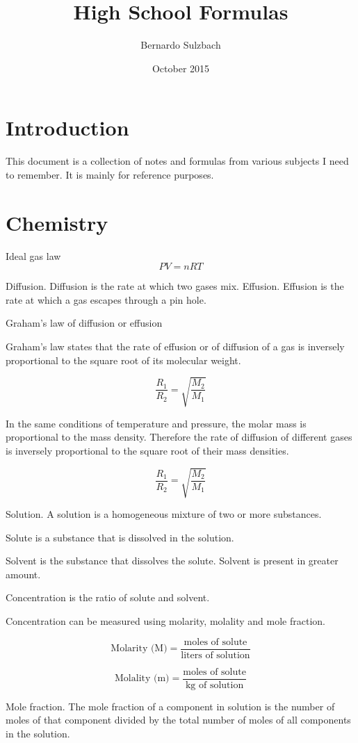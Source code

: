 \documentclass{book}
\title{High School Formulas}
\author{Bernardo Sulzbach}
\date{October 2015}
\begin{document}
\maketitle

\chapter{Introduction}
This document is a collection of notes and formulas from various subjects I need to remember.
It is mainly for reference purposes.

\chapter{Chemistry}

Ideal gas law
\[PV = nRT\]

Diffusion. Diffusion is the rate at which two gases mix.
Effusion. Effusion is the rate at which a gas escapes through a pin hole.

Graham's law of diffusion or effusion

Graham's law states that the rate of effusion or of diffusion of a gas is inversely proportional to the square root of its molecular weight.

\[\frac{R_1}{R_2} = \sqrt{\frac{M_2}{M_1}}\]

In the same conditions of temperature and pressure, the molar mass is proportional to the mass density. Therefore the rate of diffusion of different gases is inversely proportional to the square root of their mass densities.

\[\frac{R_1}{R_2} = \sqrt{\frac{M_2}{M_1}}\]

Solution. A solution is a homogeneous mixture of two or more substances.

Solute is a substance that is dissolved in the solution.

Solvent is the substance that dissolves the solute. Solvent is present in greater amount.

Concentration is the ratio of solute and solvent.

Concentration can be measured using molarity, molality and mole fraction.

\[\text{Molarity (M)} = \frac{\text{moles of solute}}{\text{liters of solution}}\]

\[\text{Molality (m)} = \frac{\text{moles of solute}}{\text{kg of solution}}\]

Mole fraction. The mole fraction of a component in solution is the number of moles of that component divided by the total number of moles of all components in the solution.
\end{document}
